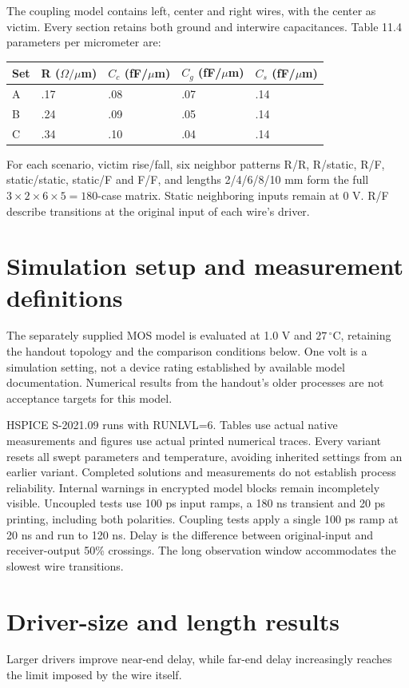 The coupling model contains left, center and right wires, with the center as victim. Every section retains both ground and interwire capacitances. Table 11.4 parameters per micrometer are:
\begin{center}\small
\begin{tabular}{lllll}
\toprule
Set & R ($\Omega/\mu$m) & $C_c$ (fF/$\mu$m) & $C_g$ (fF/$\mu$m) & $C_s$ (fF/$\mu$m) \\
\midrule
A & .17 & .08 & .07 & .14 \\
B & .24 & .09 & .05 & .14 \\
C & .34 & .10 & .04 & .14 \\
\bottomrule
\end{tabular}
\end{center}
For each scenario, victim rise/fall, six neighbor patterns R/R, R/static, R/F, static/static, static/F and F/F, and lengths 2/4/6/8/10 mm form the full $3\times2\times6\times5=180$-case matrix. Static neighboring inputs remain at 0 V. R/F describe transitions at the original input of each wire's driver.
\section{Simulation setup and measurement definitions}
The separately supplied MOS model is evaluated at 1.0 V and $27\,^{\circ}$C, retaining the handout topology and the comparison conditions below. One volt is a simulation setting, not a device rating established by available model documentation. Numerical results from the handout's older processes are not acceptance targets for this model.

HSPICE S-2021.09 runs with RUNLVL=6. Tables use actual native measurements and figures use actual printed numerical traces. Every variant resets all swept parameters and temperature, avoiding inherited settings from an earlier variant. Completed solutions and measurements do not establish process reliability. Internal warnings in encrypted model blocks remain incompletely visible.
Uncoupled tests use 100 ps input ramps, a 180 ns transient and 20 ps printing, including both polarities. Coupling tests apply a single 100 ps ramp at 20 ns and run to 120 ns. Delay is the difference between original-input and receiver-output 50\% crossings. The long observation window accommodates the slowest wire transitions.

\section{Driver-size and length results}
Larger drivers improve near-end delay, while far-end delay increasingly reaches the limit imposed by the wire itself.

